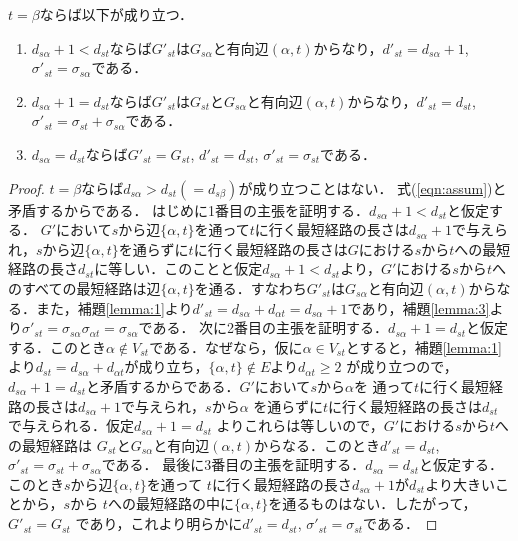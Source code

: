 \begin{lemma}
\rm 
$t=\beta$ならば以下が成り立つ．
\begin{enumerate}
\item $d_{s\alpha}+1<d_{st}$ならば$G'_{st}$は$G_{s\alpha}$と有向辺$(\alpha,t)$からなり，$d'_{st}=d_{s\alpha}+1$, $\sigma'_{st}=\sigma_{s\alpha}$である．
\item $d_{s\alpha}+1=d_{st}$ならば$G'_{st}$は$G_{st}$と$G_{s\alpha}$と有向辺$(\alpha,t)$からなり，$d'_{st}=d_{st}$, $\sigma'_{st}=\sigma_{st}+\sigma_{s\alpha}$である．
\item $d_{s\alpha}=d_{st}$ならば$G'_{st}=G_{st}$, $d'_{st}=d_{st}$, $\sigma'_{st}=\sigma_{st}$である．
\end{enumerate}
\label{lemma:6}
\end{lemma}
\begin{proof}
$t=\beta$ならば$d_{s\alpha}>d_{st}(=d_{s\beta})$が成り立つことはない．
式(\ref{eqn:assum})と矛盾するからである．
はじめに1番目の主張を証明する．$d_{s\alpha}+1<d_{st}$と仮定する．
$G'$において$s$から辺$\{\alpha,t\}$を通って$t$に行く最短経路の長さは$d_{s\alpha}+1$で与えられ，$s$から辺$\{\alpha,t\}$を通らずに$t$に行く最短経路の長さは$G$における$s$から$t$への最短経路の長さ$d_{st}$に等しい．このことと仮定$d_{s\alpha}+1<d_{st}$より，$G'$における$s$から$t$へのすべての最短経路は辺$\{\alpha,t\}$を通る．すなわち$G'_{st}$は$G_{s\alpha}$と有向辺$(\alpha,t)$からなる．また，補題\ref{lemma:1}より$d'_{st}=d_{s\alpha}+d_{\alpha t}=d_{s\alpha}+1$であり，補題\ref{lemma:3}より$\sigma'_{st}=\sigma_{s\alpha}\sigma_{\alpha t}=\sigma_{s\alpha}$である．
%
次に2番目の主張を証明する．$d_{s\alpha}+1=d_{st}$と仮定する．このとき$\alpha \not\in V_{st}$である．なぜなら，仮に$\alpha \in V_{st}$とすると，補題\ref{lemma:1}より$d_{st}=d_{s\alpha}+d_{\alpha t}$が成り立ち，$\{\alpha,t\} \not\in E$より$d_{\alpha t} \geq 2$ が成り立つので，$d_{s\alpha}+1=d_{st}$と矛盾するからである．$G'$において$s$から$\alpha$を
通って$t$に行く最短経路の長さは$d_{s\alpha}+1$で与えられ，$s$から$\alpha$
を通らずに$t$に行く最短経路の長さは$d_{st}$で与えられる．仮定$d_{s\alpha}+1=d_{st}$
よりこれらは等しいので，$G'$における$s$から$t$への最短経路は
$G_{st}$と$G_{s\alpha}$と有向辺$(\alpha,t)$からなる．このとき$d'_{st}=d_{st}$, $\sigma'_{st}=\sigma_{st}+\sigma_{s\alpha}$である．
%
最後に3番目の主張を証明する．$d_{s\alpha}=d_{st}$と仮定する．
このとき$s$から辺$\{\alpha,t\}$を通って
$t$に行く最短経路の長さ$d_{s\alpha}+1$が$d_{st}$より大きいことから，$s$から
$t$への最短経路の中に$\{\alpha,t\}$を通るものはない．したがって，$G'_{st}=G_{st}$
であり，これより明らかに$d'_{st}=d_{st}$, $\sigma'_{st}=\sigma_{st}$である．
\end{proof}

